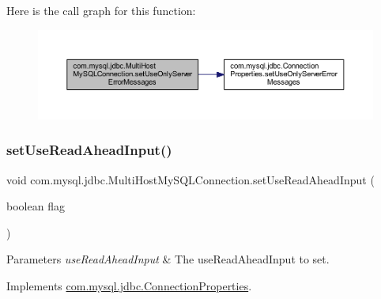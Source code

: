 Here is the call graph for this function\+:
\nopagebreak
\begin{figure}[H]
\begin{center}
\leavevmode
\includegraphics[width=350pt]{classcom_1_1mysql_1_1jdbc_1_1_multi_host_my_s_q_l_connection_a64cd255943d0563c0246595083a5f2a7_cgraph}
\end{center}
\end{figure}
\mbox{\label{classcom_1_1mysql_1_1jdbc_1_1_multi_host_my_s_q_l_connection_a21f5fe21bfa20f67e36444ccc130fa4a}} 
\subsubsection{\texorpdfstring{set\+Use\+Read\+Ahead\+Input()}{setUseReadAheadInput()}}
{\footnotesize\ttfamily void com.\+mysql.\+jdbc.\+Multi\+Host\+My\+S\+Q\+L\+Connection.\+set\+Use\+Read\+Ahead\+Input (\begin{DoxyParamCaption}\item[{boolean}]{flag }\end{DoxyParamCaption})}


\begin{DoxyParams}{Parameters}
{\em use\+Read\+Ahead\+Input} & The use\+Read\+Ahead\+Input to set. \\
\hline
\end{DoxyParams}


Implements \mbox{\hyperlink{interfacecom_1_1mysql_1_1jdbc_1_1_connection_properties_a4c83918a441a7c5938d0ec80a975b92b}{com.\+mysql.\+jdbc.\+Connection\+Properties}}.

